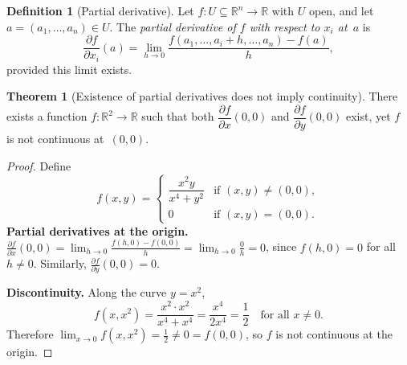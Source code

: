 \documentclass[12pt,a4paper]{book}
\theoremstyle{definition}
\newtheorem{definition}{Definition}[chapter]
\newtheorem{theorem}{Theorem}[chapter]
\begin{document}
\begin{definition}[Partial derivative]\label{def:partial-deriv}
Let $f\colon U\subseteq\mathbb{R}^n\to\mathbb{R}$ with $U$ open, and let
$a=(a_1,\dots,a_n)\in U$.  The \emph{partial derivative of $f$ with respect
to $x_i$ at~$a$} is
\[
  \frac{\partial f}{\partial x_i}(a)
  = \lim_{h\to 0}\frac{f(a_1,\dots,a_i+h,\dots,a_n)-f(a)}{h},
\]
provided this limit exists.
\end{definition}

\begin{center}
\label{fig:partial-slope}
\end{center}

\begin{theorem}[Existence of partial derivatives does not imply continuity]
\label{thm:partials-not-continuous}
There exists a function $f\colon\mathbb{R}^2\to\mathbb{R}$ such that both
$\dfrac{\partial f}{\partial x}(0,0)$ and
$\dfrac{\partial f}{\partial y}(0,0)$ exist, yet $f$ is not continuous
at~$(0,0)$.
\end{theorem}

\begin{proof}
Define
\[
  f(x,y) = \begin{cases}
    \dfrac{x^2 y}{x^4+y^2} & \text{if }(x,y)\ne(0,0),\\[6pt]
    0 & \text{if }(x,y)=(0,0).
  \end{cases}
\]
\textbf{Partial derivatives at the origin.}\;
$\frac{\partial f}{\partial x}(0,0)
  = \lim_{h\to 0}\frac{f(h,0)-f(0,0)}{h}
  = \lim_{h\to 0}\frac{0}{h}=0$, since $f(h,0)=0$ for all $h\ne 0$.
Similarly, $\frac{\partial f}{\partial y}(0,0)=0$.

\textbf{Discontinuity.}\; Along the curve $y=x^2$,
\[
  f(x,x^2)=\frac{x^2\cdot x^2}{x^4+x^4}=\frac{x^4}{2x^4}=\frac{1}{2}
  \quad\text{for all }x\ne 0.
\]
Therefore $\lim_{x\to 0}f(x,x^2)=\tfrac12\ne 0=f(0,0)$, so $f$ is not
continuous at the origin.
\end{proof}
\end{document}
